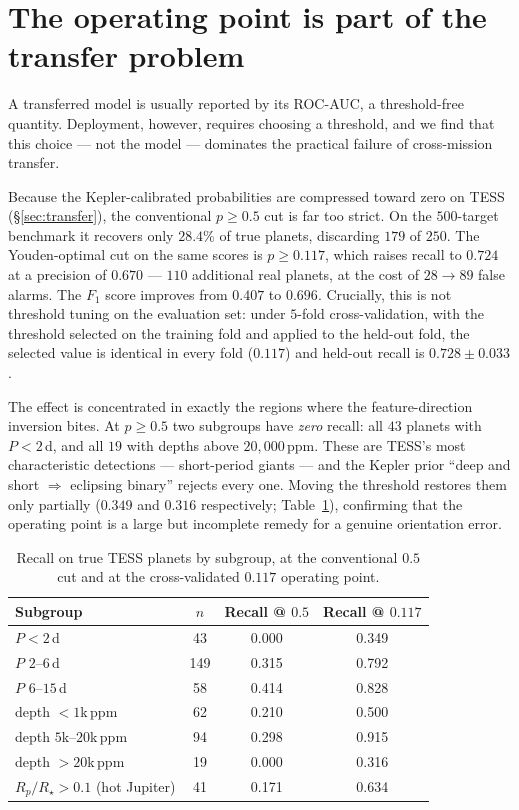 \documentclass[11pt]{article}
\begin{document}
\section{The operating point is part of the transfer problem}
\label{sec:threshold}
A transferred model is usually reported by its ROC-AUC, a threshold-free
quantity. Deployment, however, requires choosing a threshold, and we find that
this choice --- not the model --- dominates the practical failure of cross-mission
transfer.

Because the Kepler-calibrated probabilities are compressed toward zero on TESS
(\S\ref{sec:transfer}), the conventional $p \geq 0.5$ cut is far too strict. On the $500$-target
benchmark it recovers only $28.4\%$ of true planets, discarding $179$ of $250$.
The Youden-optimal cut on the same scores is $p \geq 0.117$, which raises recall
to $0.724$ at a precision of $0.670$ --- $110$ additional real planets, at the
cost of $28 \rightarrow 89$ false alarms. The $F_1$ score improves from $0.407$
to $0.696$. Crucially, this is not threshold tuning on the evaluation set: under
$5$-fold cross-validation, with the threshold selected on the training fold and
applied to the held-out fold, the selected value is identical in every fold
($0.117$) and held-out recall is $0.728 \pm 0.033$.

The effect is concentrated in exactly the regions where the feature-direction
inversion bites. At $p \geq 0.5$ two subgroups have \emph{zero} recall: all $43$
planets with $P < 2$\,d, and all $19$ with depths above $20{,}000$\,ppm. These
are TESS's most characteristic detections --- short-period giants --- and the
Kepler prior ``deep and short $\Rightarrow$ eclipsing binary'' rejects every one.
Moving the threshold restores them only partially ($0.349$ and $0.316$
respectively; Table~\ref{tab:blindspots}), confirming that the operating point is
a large but incomplete remedy for a genuine orientation error.

\begin{table}[t]
\centering
\caption{Recall on true TESS planets by subgroup, at the conventional $0.5$ cut
and at the cross-validated $0.117$ operating point.}
\label{tab:blindspots}
\begin{tabular}{lccc}
\toprule
Subgroup & $n$ & Recall @ $0.5$ & Recall @ $0.117$ \\
\midrule
$P < 2$\,d                       & 43  & 0.000 & 0.349 \\
$P$ $2$--$6$\,d                  & 149 & 0.315 & 0.792 \\
$P$ $6$--$15$\,d                 & 58  & 0.414 & 0.828 \\
depth $<1$k\,ppm                 & 62  & 0.210 & 0.500 \\
depth $5$k--$20$k\,ppm           & 94  & 0.298 & 0.915 \\
depth $>20$k\,ppm                & 19  & 0.000 & 0.316 \\
$R_p/R_\star > 0.1$ (hot Jupiter)& 41  & 0.171 & 0.634 \\
\bottomrule
\end{tabular}
\end{table}
\end{document}
